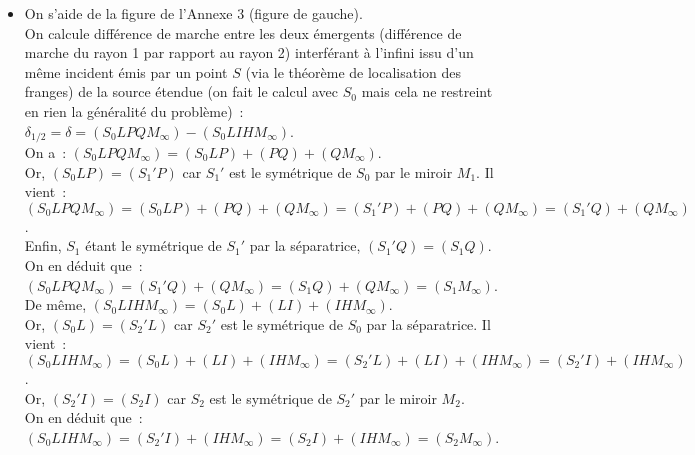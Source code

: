 \documentclass{article}
\begin{document}
\begin{itemize}
\item On s'aide de la figure de l'Annexe 3 (figure de gauche). \\
On calcule différence de marche entre les deux émergents (différence
de marche du rayon 1 par rapport au rayon 2) interférant à l'infini
issu d'un même incident émis par un point $S$ (via le théorème de
localisation des franges) de la source étendue (on fait le calcul
avec $S_{0}$ mais cela ne restreint en rien la généralité du
problème) : $\delta_{\mathrm{1/2}} = \delta =
\left(S_{0}LPQM_{\mathrm{\infty}}\right)-\left(S_{0}LIHM_{\mathrm{\infty}}\right)$. \\
On a : $\left(S_{0}LPQM_{\mathrm{\infty}}\right) = \left(S_{0}LP\right)+(PQ)+\left(QM_{\mathrm{\infty}}\right)$.
\\
Or, $\left(S_{0}LP\right) = \left(S_{1}'P\right)$ car $S_{1}'$ est le symétrique de
$S_{0}$ par le miroir $M_{1}$. Il vient : \\
$\left(S_{0}LPQM_{\mathrm{\infty}}\right) = \left(S_{0}LP\right)+(PQ)+\left(QM_{\mathrm{\infty}}\right) =
\left(S_{1}'P\right)+(PQ)+\left(QM_{\mathrm{\infty}}\right) = \left(S_{1}'Q\right)+\left(QM_{\mathrm{\infty}}\right)$. \\
Enfin, $S_{1}$ étant le symétrique de $S_{1}'$ par la séparatrice,
$\left(S_{1}'Q\right) = \left(S_{1}Q\right)$. On en déduit que : $\left(S_{0}LPQM_{\mathrm{\infty}}\right) =
\left(S_{1}'Q\right)+\left(QM_{\mathrm{\infty}}\right) = \left(S_{1}Q\right)+\left(QM_{\mathrm{\infty}}\right) =\left(S_{1}M_{\mathrm{\infty}}\right)$. \\
De même, $\left(S_{0}LIHM_{\mathrm{\infty}}\right)=\left(S_{0}L\right)+(LI)+\left(IHM_{\mathrm{\infty}}\right)$. \\
Or, $\left(S_{0}L\right) = \left(S_{2}'L\right)$ car $S_{2}'$ est le symétrique de
$S_{0}$ par la séparatrice. Il vient : \\
$\left(S_{0}LIHM_{\mathrm{\infty}}\right) = \left(S_{0}L\right)+(LI)+\left(IHM_{\mathrm{\infty}}\right) = \left(S_{2}'L\right)+(LI)+\left(IHM_{\mathrm{\infty}}\right) = \left(S_{2}'I\right) + \left(IHM_{\mathrm{\infty}}\right)$. \\
Or, $\left(S_{2}'I\right) = \left(S_{2}I\right)$ car $S_{2}$ est le symétrique de $S_{2}'$
par le miroir $M_{2}$. \\
On en déduit que : $\left(S_{0}LIHM_{\mathrm{\infty}}\right) = \left(S_{2}'I\right) +
\left(IHM_{\mathrm{\infty}}\right) =  \left(S_{2}I\right)+\left(IHM_{\mathrm{\infty}}\right) = \left(S_{2}M_{\mathrm{\infty}}\right)$.

\end{itemize}
\end{document}
